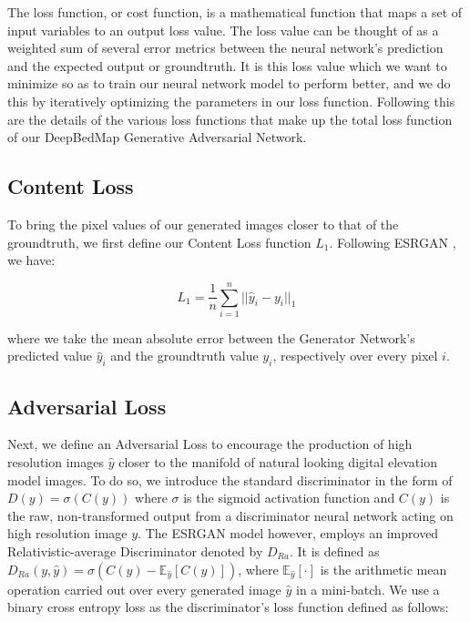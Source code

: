 \documentclass[tc, manuscript]{copernicus}
\begin{document}
The loss function, or cost function, is a mathematical function that maps a set of input variables to an output loss value.
The loss value can be thought of as a weighted sum of several error metrics between the neural network's prediction and the expected output or groundtruth.
It is this loss value which we want to minimize so as to train our neural network model to perform better, and we do this by iteratively optimizing the parameters in our loss function.
Following this are the details of the various loss functions that make up the total loss function of our DeepBedMap Generative Adversarial Network.

\subsection{Content Loss}

To bring the pixel values of our generated images closer to that of the groundtruth, we first define our Content Loss function $L_1$.
Following ESRGAN \citep{WangESRGANEnhancedSuperResolution2018}, we have:

\begin{equation}\label{eq:A1}
  L_1 = \dfrac{1}{n} \sum\limits_{i=1}^n ||\hat{y}_i - y_i||_{1}
\end{equation}

where we take the mean absolute error between the Generator Network's predicted value $\hat{y}_i$ and the groundtruth value $y_i$, respectively over every pixel $i$.

\subsection{Adversarial Loss}

Next, we define an Adversarial Loss to encourage the production of high resolution images $\hat{y}$ closer to the manifold of natural looking digital elevation model images.
To do so, we introduce the standard discriminator in the form of $D(y) = \sigma(C(y))$ where $\sigma$ is the sigmoid activation function and $C(y)$ is the raw, non-transformed output from a discriminator neural network acting on high resolution image $y$.
The ESRGAN model \citep{WangESRGANEnhancedSuperResolution2018} however, employs an improved Relativistic-average Discriminator \citep{Jolicoeur-Martineaurelativisticdiscriminatorkey2018} denoted by $D_{Ra}$.
It is defined as $D_{Ra}(y,\hat{y}) = \sigma(C(y) - \mathbb{E}_{\hat{y}}[C(\hat{y})])$, where $\mathbb{E}_{\hat{y}}[\cdot]$ is the arithmetic mean operation carried out over every generated image $\hat{y}$ in a mini-batch.
We use a binary cross entropy loss as the discriminator's loss function defined as follows:
\end{document}
